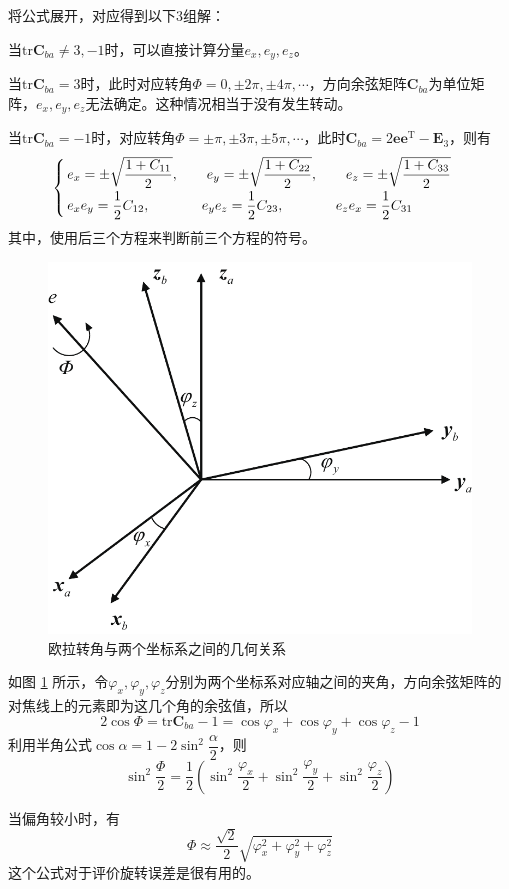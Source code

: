 \noindent 将公式展开，对应得到以下3组解：

\noa[1] 当$\text{tr} \bm{C}_{ba} \neq 3, -1$时，可以直接计算分量$e_x, e_y, e_z$。

\noa[2] 当$\text{tr} \bm{C}_{ba} = 3$时，此时对应转角$\varPhi = 0, \pm 2 \pi, \pm 4 \pi, \cdots$，方向余弦矩阵$\bm{C}_{ba}$为单位矩阵，$e_x, e_y, e_z$无法确定。这种情况相当于没有发生转动。

\noa[3] 当$\text{tr} \bm{C}_{ba} = -1$时，对应转角$\varPhi = \pm \pi, \pm 3 \pi, \pm 5 \pi, \cdots$，此时$\bm{C}_{ba} = 2 \bm{e}\bm{e}^{\text{T}} - \bm{E}_3$，则有
\begin{equation}
	\begin{cases}
		\, e_x = \pm \sqrt{\dfrac{1 + C_{11}}{2}}, \qquad e_y = \pm \sqrt{\dfrac{1+ C_{22}}{2}}, \qquad e_z = \pm \sqrt{\dfrac{1 + C_{33}}{2}} \\[0.5em]
		\, e_x e_y = \dfrac{1}{2} C_{12}, \hspace*{3.7em} e_ye_z = \dfrac{1}{2}C_{23}, \hspace*{3.7em} e_ze_x = \dfrac{1}{2} C_{31}
	\end{cases}
\end{equation}
其中，使用后三个方程来判断前三个方程的符号。

\begin{figure}[!htb]
	\centering
	\includegraphics[width=0.4\linewidth]{pic/欧拉轴角变换}
	\vspace*{-1em}
	\caption{欧拉转角与两个坐标系之间的几何关系}
	\label{欧拉转角变换}
\end{figure}


\sssection[欧拉转角的几何意义]

如图 \ref{欧拉转角变换} 所示，令$\varphi_x, \varphi_y, \varphi_z$分别为两个坐标系对应轴之间的夹角，方向余弦矩阵的对焦线上的元素即为这几个角的余弦值，所以
\begin{equation}
	2 \cos \varPhi = \text{tr} \bm{C}_{ba} - 1 = \cos \varphi_x + \cos \varphi_y + \cos \varphi_z - 1
\end{equation}
利用半角公式$\cos \alpha = 1 - 2 \sin^2 \dfrac{\alpha}{2}$，则
\begin{equation}
	\sin^2 \dfrac{\varPhi}{2} = \dfrac{1}{2} \left( \sin^2 \dfrac{\varphi_x}{2} + \sin^2 \dfrac{\varphi_y}{2} + \sin^2 \dfrac{\varphi_z}{2} \right)
\end{equation}

当偏角较小时，有
\begin{equation}
	\varPhi \approx \dfrac{\sqrt{2}}{2} \sqrt{\varphi_x^2 + \varphi_y^2 + \varphi_z^2}
\end{equation}
这个公式对于评价旋转误差是很有用的。





















